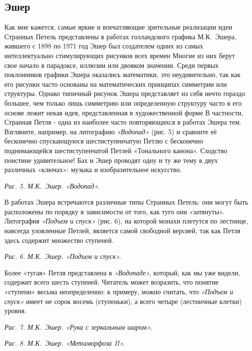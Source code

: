 \documentclass[../main.tex]{subfiles}
\begin{document}
\subsection{Эшер}

Как мне кажется, самые яркие и впечатляющие зрительные реализации идеи Странных Петель представлены в работах голландского графика М.К.~Эшера, жившего с 1898 по 1971 год Эшер был создателем одних из самых интеллектуально стимулирующих рисунков всех времен Многие из них берут свое начало в парадоксе, иллюзии или двояком значении. Среди первых поклонников графики Эшера оказались математики, это неудивительно, так как его рисунки часто основаны на математических принципах симметрии или структуры. Однако типичный рисунок Эшера представляет из себя нечто гораздо большее, чем только лишь симметрию или определенную структуру часто в его основе лежит некая идея, представленная в художественной форме В частности, Странная Петля - одна из наиболее часто повторяющихся в работах Эшера тем. Взгляните, например, на литографию \emph{«Водопад»} (рис. 5) и сравните её бесконечно спускающуюся шестиступенчатую Петлю с бесконечно поднимающейся шестиступенчатой Петлей «Тонального канона». Сходство поистине удивительное! Бах и Эшер проводят одну и ту же тему в двух различных «ключах»: музыка и изобразительное искусство.

\emph{Рис. 5. М.К.~Эшер. «Водопад».}

В работах Эшера встречаются различные типы Странных Петель: они могут быть расположены по порядку в зависимости от того, как туго они «затянуты». Литография \emph{«Подъем и спуск»} (рис. 6), на которой монахи плетутся по лестнице, навсегда уловленные Петлей, является самой свободной версией, так как Петля здесь содержит множество ступеней.

\emph{Рис. 6. М.К.~Эшер. «Подъем и спуск».}

Более «тугая» Петля представлена в \emph{«Водопаде»,} который, как мы уже видели, содержит всего шесть ступеней. Читатель может возразить, что понятие «ступени» весьма неопределенно: к примеру, можно считать, что \emph{«Подъем и спуск»} имеет не сорок восемь (ступеньки), а всего четыре (лестничные клетки) уровня.

\emph{Рис. 7. М.К.~Эшер. «Рука с зеркальным шаром».}

\emph{Рис. 8. М.К.~Эшер. «Метаморфоза II».}
\end{document}

